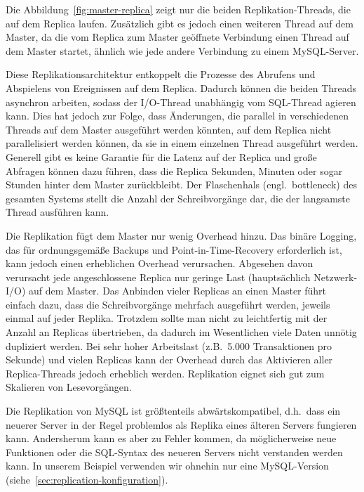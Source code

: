 Die Abbildung~\ref{fig:master-replica} zeigt nur die beiden Replikation-Threads, die auf dem Replica laufen.
Zusätzlich gibt es jedoch einen weiteren Thread auf dem Master, da die vom Replica zum Master geöffnete Verbindung einen Thread auf dem Master startet, ähnlich wie jede andere Verbindung zu einem MySQL-Server.

Diese Replikationsarchitektur entkoppelt die Prozesse des Abrufens und Abspielens von Ereignissen auf dem Replica.
Dadurch können die beiden Threads asynchron arbeiten, sodass der I/O-Thread unabhängig vom SQL-Thread agieren kann.
Dies hat jedoch zur Folge, dass Änderungen, die parallel in verschiedenen Threads auf dem Master ausgeführt werden könnten, auf dem Replica nicht parallelisiert werden können, da sie in einem einzelnen Thread ausgeführt werden.
Generell gibt es keine Garantie für die Latenz auf der Replica und große Abfragen können dazu führen, dass die Replica Sekunden, Minuten oder sogar Stunden hinter dem Master zurückbleibt.
Der Flaschenhals (engl.\ bottleneck) des gesamten Systems stellt die Anzahl der Schreibvorgänge dar, die der langsamste Thread ausführen kann.

Die Replikation fügt dem Master nur wenig Overhead hinzu.
Das binäre Logging, das für ordnungsgemäße Backups und Point-in-Time-Recovery erforderlich ist, kann jedoch einen erheblichen Overhead verursachen.
Abgesehen davon verursacht jede angeschlossene Replica nur geringe Last (hauptsächlich Netzwerk-I/O) auf dem Master.
Das Anbinden vieler Replicas an einen Master führt einfach dazu, dass die Schreibvorgänge mehrfach ausgeführt werden, jeweils einmal auf jeder Replika.
Trotzdem sollte man nicht zu leichtfertig mit der Anzahl an Replicas übertrieben, da dadurch im Wesentlichen viele Daten unnötig dupliziert werden.
Bei sehr hoher Arbeitslast (z.B.\ 5.000 Transaktionen pro Sekunde) und vielen Replicas kann der Overhead durch das Aktivieren aller Replica-Threads jedoch erheblich werden.
Replikation eignet sich gut zum Skalieren von Lesevorgängen.

Die Replikation von MySQL ist größtenteils abwärtskompatibel, d.h.\ dass ein neuerer Server in der Regel problemlos als Replika eines älteren Servers fungieren kann.
Andersherum kann es aber zu Fehler kommen, da möglicherweise neue Funktionen oder die SQL-Syntax des neueren Servers nicht verstanden werden kann.
In unserem Beispiel verwenden wir ohnehin nur eine MySQL-Version (siehe~\ref{sec:replication-konfiguration}).

